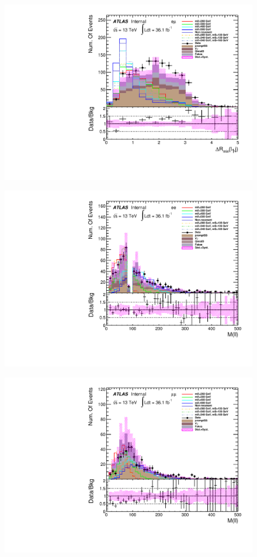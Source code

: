 \begin{figure}[h]
\begin{minipage}[t]{0.33\linewidth}
 \includegraphics[width=1.0\textwidth,angle=-90]{fig/dataMC_low_Njet_CR/mindR_l1j_emu.pdf}\label{fig:dataMC_low_Njet_CR:mindRl1j_emu.pdf}
 \end{minipage}
 \begin{minipage}[t]{0.33\linewidth}
 \centering
 \includegraphics[width=1.0\textwidth,angle=-90]{fig/dataMC_low_Njet_CR/m_ll_ee.pdf}
 \label{fig:dataMC_low_Njet_CR:m_ll_ee.pdf}
 \end{minipage}
 \begin{minipage}[t]{0.33\linewidth}
 \centering
 \includegraphics[width=1.0\textwidth,angle=-90]{fig/dataMC_low_Njet_CR/m_ll_mumu.pdf}

\end{minipage}
\end{figure}

